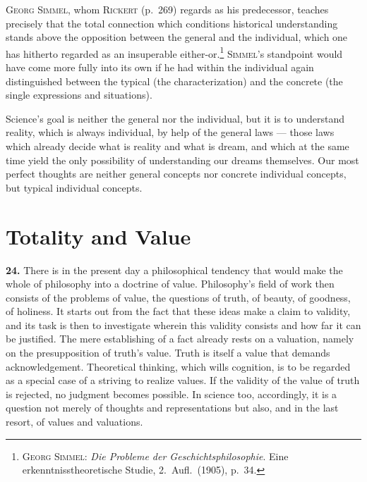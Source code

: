 \documentclass[12pt]{book}
\newcommand{\hnum}[1]{\textbf{#1.}\enspace}
\newcommand{\opage}[1]{\marginnote{\footnotesize\textit{[#1]}}}
\begin{document}
\textsc{Georg Simmel}, whom \textsc{Rickert} (p.\ 269) regards as his predecessor, teaches
precisely that the total connection which conditions historical understanding stands above the
opposition between the general and the individual, which one has hitherto regarded as an
insuperable either-or.\footnote{\textsc{Georg Simmel}: \textit{Die Probleme der
Geschichtsphilosophie}. Eine erkenntnisstheoretische Studie, 2.\ Aufl.\ (1905), p.\ 34.}
\textsc{Simmel}'s standpoint would have come more fully into its own if he had within the
individual again distinguished between the typical (the characterization) and the concrete (the
single expressions and situations).

Science's goal is neither the general nor the individual, but it is to understand reality,
which is always individual, by help of the general laws --- those laws which already decide
what is reality and what is dream, and which at the same time yield the only possibility of
understanding our dreams themselves. Our most perfect thoughts are neither general concepts nor
concrete individual concepts, but typical individual concepts.



\chapter{Totality and Value}
\label{ch:5}

\hnum{24} There is in the present day a philosophical tendency that would make the
whole of philosophy into a doctrine of value. Philosophy's field of work then
consists of the problems of value, the questions of truth, of beauty, of goodness,
of holiness. It starts out from the fact that these ideas make a claim to validity,
and its task is then to investigate wherein this validity consists and how far it
can be justified. The mere establishing of a fact already rests on a valuation,
namely on the presupposition of truth's value. Truth is itself a value that demands
acknowledgement. Theoretical thinking, which wills cognition, is to be regarded as a
special case of a striving to realize values. \opage{67}If the validity of the value of truth
is rejected, no judgment becomes possible. In science too, accordingly, it is a
question not merely of thoughts and representations but also, and in the last
resort, of values and valuations.
\end{document}
